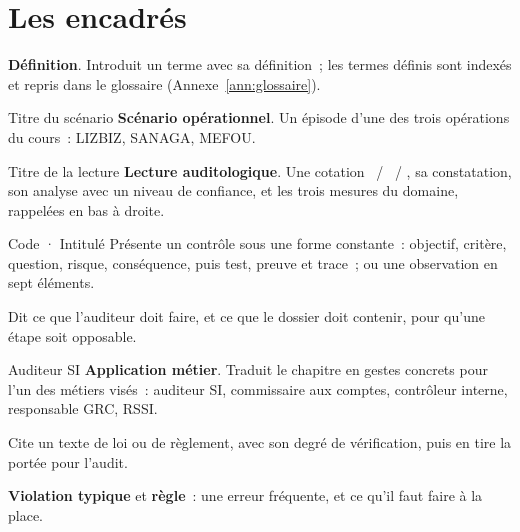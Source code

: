 \section*{Les encadrés}

\begin{boxdef}
\textbf{Définition}. Introduit un terme avec sa définition~; les termes
définis sont indexés et repris dans le glossaire (Annexe~\ref{ann:glossaire}).
\end{boxdef}

\begin{boxscenario}{Titre du scénario}
\textbf{Scénario opérationnel}. Un épisode d'une des trois opérations du
cours~: LIZBIZ, SANAGA, MEFOU.
\end{boxscenario}

\begin{boxlecture}{Titre de la lecture}
\textbf{Lecture auditologique}. Une cotation \OUI{}~/ \NON{}~/ \NEK{}, sa
constatation, son analyse avec un niveau de confiance, et les trois mesures
du domaine, rappelées en bas à droite.

\medskip
\hfill{}
\end{boxlecture}

\begin{boxobjet}{Code · Intitulé}
Présente un contrôle sous une forme constante~: objectif, critère, question,
risque, conséquence, puis test, preuve et trace~; ou une observation en
sept éléments.
\end{boxobjet}

\begin{boxprocedure}
Dit ce que l'auditeur doit faire, et ce que le dossier doit contenir, pour
qu'une étape soit opposable.
\end{boxprocedure}

\begin{boxmetier}{Auditeur SI}
\textbf{Application métier}. Traduit le chapitre en gestes concrets pour
l'un des métiers visés~: auditeur SI, commissaire aux comptes, contrôleur
interne, responsable GRC, RSSI.
\end{boxmetier}

\begin{boxjuris}
Cite un texte de loi ou de règlement, avec son degré de vérification, puis
en tire la portée pour l'audit.
\end{boxjuris}

\begin{boxalert}
\textbf{Violation typique} et \textbf{règle}~: une erreur fréquente, et ce
qu'il faut faire à la place.
\end{boxalert}

